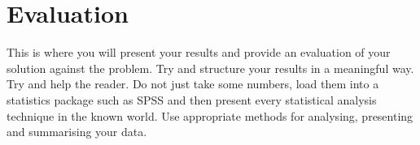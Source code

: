 %
%

\chapter{Evaluation}

This is where you will present your results and provide an evaluation of your
solution against the problem.   Try and structure your results in a meaningful
way.  Try and help the reader.  Do not just take some numbers, load them into a
statistics package such as SPSS and then present every statistical analysis
technique in the known world.  Use appropriate methods for analysing,
presenting and summarising your data.
